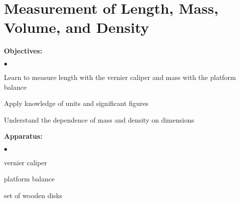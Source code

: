 
\section{Measurement of Length, Mass, Volume, and Density}

\makelabheader %

{\noindent \bf Objectives:} \begin{list}{$\bullet$}{\itemsep0pt }

\item Learn to measure length with the vernier caliper and mass with the platform balance \item Apply knowledge of units and significant figures \item Understand the dependence of mass and density on dimensions

\end{list}

{\noindent \bf Apparatus:} \begin{list}{$\bullet$}{\itemsep0pt }

\item vernier caliper \item platform balance \item set of wooden disks

\end{list}

